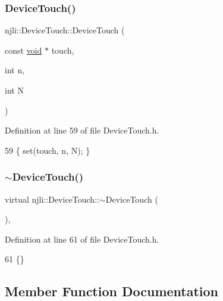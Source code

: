 \subsubsection{\texorpdfstring{Device\+Touch()}{DeviceTouch()}\hspace{0.1cm}{\footnotesize\ttfamily [3/3]}}
{\footnotesize\ttfamily njli\+::\+Device\+Touch\+::\+Device\+Touch (\begin{DoxyParamCaption}\item[{const \mbox{\hyperlink{_thread_8h_af1e856da2e658414cb2456cb6f7ebc66}{void}} $\ast$}]{touch,  }\item[{int}]{n,  }\item[{int}]{N }\end{DoxyParamCaption})\hspace{0.3cm}{\ttfamily [inline]}}



Definition at line 59 of file Device\+Touch.\+h.


\begin{DoxyCode}
59 \{ \textcolor{keyword}{set}(touch, n, N); \}
\end{DoxyCode}
\mbox{\label{classnjli_1_1_device_touch_adc6021981c650837f9ddb1486972a9a2}} 
\subsubsection{\texorpdfstring{$\sim$\+Device\+Touch()}{~DeviceTouch()}}
{\footnotesize\ttfamily virtual njli\+::\+Device\+Touch\+::$\sim$\+Device\+Touch (\begin{DoxyParamCaption}{ }\end{DoxyParamCaption})\hspace{0.3cm}{\ttfamily [inline]}, {\ttfamily [virtual]}}



Definition at line 61 of file Device\+Touch.\+h.


\begin{DoxyCode}
61 \{\}
\end{DoxyCode}


\subsection{Member Function Documentation}
\mbox{\label{classnjli_1_1_device_touch_a2707fe5acb996fe22b1b20ceb6b1e063}} 
